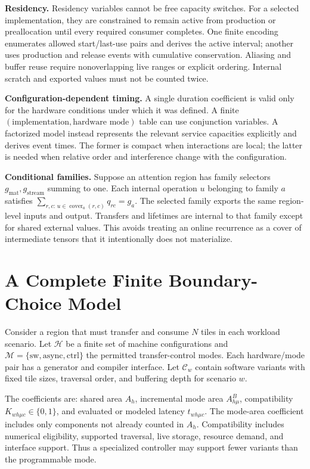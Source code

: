 \textbf{Residency.}
Residency variables cannot be free capacity switches. For a selected implementation, they are constrained to remain active from production or preallocation until every required consumer completes. One finite encoding enumerates allowed start/last-use pairs and derives the active interval; another uses production and release events with cumulative conservation. Aliasing and buffer reuse require nonoverlapping live ranges or explicit ordering. Internal scratch and exported values must not be counted twice.

\textbf{Configuration-dependent timing.}
A single duration coefficient is valid only for the hardware conditions under which it was defined. A finite $(\text{implementation},\text{hardware mode})$ table can use conjunction variables. A factorized model instead represents the relevant service capacities explicitly and derives event times. The former is compact when interactions are local; the latter is needed when relative order and interference change with the configuration.

\textbf{Conditional families.}
Suppose an attention region has family selectors $g_{\mathrm{mat}},g_{\mathrm{stream}}$ summing to one. Each internal operation $u$ belonging to family $a$ satisfies $\sum_{r,c:\,u\in\operatorname{cover}_a(r,c)}q_{rc}=g_a$. The selected family exports the same region-level inputs and output. Transfers and lifetimes are internal to that family except for shared external values. This avoids treating an online recurrence as a cover of intermediate tensors that it intentionally does not materialize.

\section{A Complete Finite Boundary-Choice Model}\label{app:boundary}
Consider a region that must transfer and consume $N$ tiles in each workload scenario. Let $\mathcal H$ be a finite set of machine configurations and $\mathcal M=\{\mathrm{sw},\mathrm{async},\mathrm{ctrl}\}$ the permitted transfer-control modes. Each hardware/mode pair has a generator and compiler interface. Let $\mathcal C_w$ contain software variants with fixed tile sizes, traversal order, and buffering depth for scenario $w$.

The coefficients are: shared area $A_h$, incremental mode area $A^B_{h\mu}$, compatibility $K_{wh\mu c}\in\{0,1\}$, and evaluated or modeled latency $t_{wh\mu c}$. The mode-area coefficient includes only components not already counted in $A_h$. Compatibility includes numerical eligibility, supported traversal, live storage, resource demand, and interface support. Thus a specialized controller may support fewer variants than the programmable mode.

